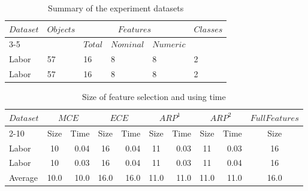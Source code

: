 \documentclass[final,5p,times]{elsarticle}
\begin{document}
\begin{table*}[htbp]
\centering
\caption{Summary of the experiment datasets}
\label{tab datasets des}
	\begin{tabular}{llllll}
	\toprule
	\multirow{3}{*}{\centering $Dataset$} &
 	\multirow{3}{*}{\centering $Objects$} &
 	\multicolumn{3}{c}{$Features$} & 
	\multirow{3}{*}{\centering $Classes$}\\
	\cmidrule{3-5}
	&&$Total$&$Nominal$&$Numeric$\\
	\midrule
	Labor	&	57	&	16	&	8	&	8	&	2	\\
	Labor	&	57	&	16	&	8	&	8	&	2	\\
	\bottomrule
	\end{tabular}
\end{table*}
\begin{table*}[htbp]
\centering
\caption{Size of feature selection and using time}
\label{tab size time}
	\begin{tabular}{lcrcrcrcrc}
	\toprule
	\multirow{3}{*}{\centering $Dataset$}&
	\multicolumn{2}{c}{$MCE$} &
	\multicolumn{2}{c}{$ECE$} &
	\multicolumn{2}{c}{$ARP^1$} &
	\multicolumn{2}{c}{$ARP^2$} &
	\multicolumn{1}{c}{$FullFeatures$}\\
	\cmidrule{2-10}&
	Size&Time&
	Size&Time&
	Size&Time&
	Size&Time&
	Size\\
	\midrule
	Labor	&	10	&	0.04	&	16	&	0.04	&	11	&	0.03	&	11	&	0.03	&	16\\
	Labor	&	10	&	0.03	&	16	&	0.04	&	11	&	0.03	&	11	&	0.04	&	16\\
	\midrule
	Average	&	10.0	&	10.0	&	16.0	&	16.0	&	11.0	&	11.0	&	11.0	&	11.0	&	16.0\\
	\bottomrule
	\end{tabular}
\end{table*}
\end{document}

